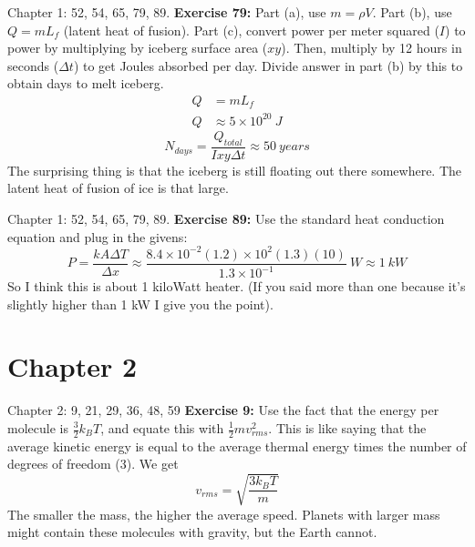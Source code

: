 \documentclass{beamer}
\begin{document}
\begin{frame}{Chapter 1: 52, 54, 65, 79, 89.}
\small
\textbf{Exercise 79:} Part (a), use $m=\rho V$.  Part (b), use $Q = mL_f$ (latent heat of fusion).  Part (c), convert power per meter squared ($I$) to power by multiplying by iceberg surface area ($xy$).  Then, multiply by 12 hours in seconds ($\Delta t$) to get Joules absorbed per day.  Divide answer in part (b) by this to obtain days to melt iceberg.
\begin{align}
Q &= m L_f \\
Q &\approx 5\times 10^{20}~J
\end{align}
\begin{equation}
N_{days} = \frac{Q_{total}}{Ixy\Delta t} \approx 50~years
\end{equation}
The surprising thing is that the iceberg is still floating out there somewhere.  The latent heat of fusion of ice is that large.
\end{frame}

\begin{frame}{Chapter 1: 52, 54, 65, 79, 89.}
\small
\textbf{Exercise 89:} Use the standard heat conduction equation and plug in the givens:
\begin{equation}
P = \frac{kA\Delta T}{\Delta x} \approx \frac{8.4\times 10^{-2}(1.2)\times 10^2(1.3)(10)}{1.3\times 10^{-1}} ~ W \approx 1~kW
\end{equation}
So I think this is about 1 kiloWatt heater.  (If you said more than one because it's slightly higher than 1 kW I give you the point).
\end{frame}

\section{Chapter 2}

\begin{frame}{Chapter 2: 9, 21, 29, 36, 48, 59}
\small
\textbf{Exercise 9:} Use the fact that the energy per molecule is $\frac{3}{2}k_B T$, and equate this with $\frac{1}{2}mv_{rms}^2$.  This is like saying that the average kinetic energy is equal to the average thermal energy times the number of degrees of freedom (3).  We get
\begin{equation}
v_{rms} = \sqrt{\frac{3k_B T}{m}}
\end{equation}
The smaller the mass, the higher the average speed.  Planets with larger mass might contain these molecules with gravity, but the Earth cannot.
\end{frame}
\end{document}
